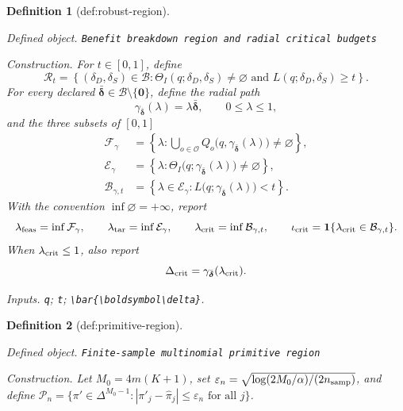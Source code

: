 \documentclass{article}
\newtheorem{definition}{Definition}
\begin{document}
\begin{definition}[def:robust-region]\label{def:robust-region}
\par\smallskip\noindent\emph{Defined object.} \texttt{Benefit breakdown region and radial critical budgets}
\par\smallskip\noindent\emph{Construction.} For \(t\in[0,1]\), define
\[
 \mathcal R_t=
 \left\{(\delta_D,\delta_S)\in\mathcal B:
 \Theta_I(q;\delta_D,\delta_S)\neq\varnothing
 \text{ and }L(q;\delta_D,\delta_S)\geq t\right\}.
\]
For every declared \(\bar{\boldsymbol\delta}\in\mathcal B\setminus\{\boldsymbol0\}\), define the radial path
\[
 \gamma_{\bar{\boldsymbol\delta}}(\lambda)
 =\lambda\bar{\boldsymbol\delta},
 \qquad 0\leq\lambda\leq1,
\]
and the three subsets of \([0,1]\)
\[
 \begin{aligned}
 \mathcal F_\gamma
 &=\left\{\lambda:\bigcup_{o\in\mathcal O}
 Q_o\bigl(q,\gamma_{\bar{\boldsymbol\delta}}(\lambda)\bigr)
 \neq\varnothing\right\},\\
 \mathcal E_\gamma
 &=\left\{\lambda:
 \Theta_I\bigl(q;\gamma_{\bar{\boldsymbol\delta}}(\lambda)\bigr)
 \neq\varnothing\right\},\\
 \mathcal B_{\gamma,t}
 &=\left\{\lambda\in\mathcal E_\gamma:
 L\bigl(q;\gamma_{\bar{\boldsymbol\delta}}(\lambda)\bigr)<t\right\}.
 \end{aligned}
\]
With the convention \(\inf\varnothing=+\infty\), report
\[
 \lambda_{\rm feas}=\inf\mathcal F_\gamma,
 \qquad
 \lambda_{\rm tar}=\inf\mathcal E_\gamma,
 \qquad
 \lambda_{\rm crit}=\inf\mathcal B_{\gamma,t},
 \qquad
 \iota_{\rm crit}=\mathbf 1\{\lambda_{\rm crit}\in\mathcal B_{\gamma,t}\}.
\]
When \(\lambda_{\rm crit}\leq1\), also report
\[
 \Delta_{\rm crit}
 =\gamma_{\bar{\boldsymbol\delta}}(\lambda_{\rm crit}).
\]
\par\smallskip\noindent\emph{Inputs.} \texttt{q}; \texttt{t}; \texttt{\textbackslash{}\allowbreak{}bar\{\textbackslash{}\allowbreak{}boldsymbol\textbackslash{}\allowbreak{}delta\}\allowbreak{}}.
\end{definition}

\begin{definition}[def:primitive-region]\label{def:primitive-region}
\par\smallskip\noindent\emph{Defined object.} \texttt{Finite-\allowbreak{}sample multinomial primitive region}
\par\smallskip\noindent\emph{Construction.} Let \(M_0=4m(K+1)\), set \(\varepsilon_n=\sqrt{\log(2M_0/\alpha)/(2n_{\rm samp})}\), and define \(\mathcal P_n=\{\pi'\in\Delta^{M_0-1}:|\pi'_j-\widehat\pi_j|\le\varepsilon_n\text{ for all }j\}\).
\end{definition}
\end{document}
